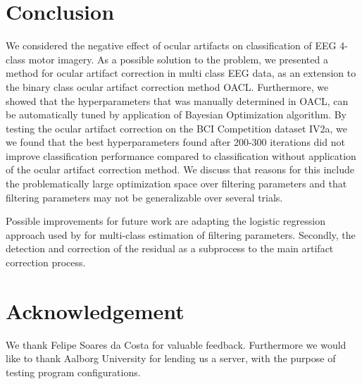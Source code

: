 \section{Conclusion}
We considered the negative effect of ocular artifacts on classification of EEG 4-class motor imagery. As a possible solution to the problem, we presented a method for ocular artifact correction in multi class EEG data, as an extension to the binary class ocular artifact correction method OACL\citep{li2015ocular}. Furthermore, we showed that the hyperparameters that was manually determined in OACL, can be automatically tuned by application of Bayesian Optimization algorithm. By testing the ocular artifact correction on the BCI Competition dataset IV2a, we  we found that the best hyperparameters found after 200-300 iterations did not improve classification performance compared to classification without application of the ocular artifact correction method. We discuss that reasons for this include the problematically large optimization space over filtering parameters and that filtering parameters may not be generalizable over several trials.

Possible improvements for future work are adapting the logistic regression approach used by \citep{li2015ocular} for multi-class estimation of filtering parameters. Secondly, the detection and correction of the residual as a subprocess to the main artifact correction process. 

\section{Acknowledgement}
We thank Felipe Soares da Costa for valuable feedback. Furthermore we would like to thank Aalborg University for lending us a server, with the purpose of testing program configurations.  